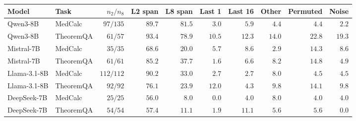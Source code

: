 \begin{tabular*}{\textwidth}{@{\extracolsep{\fill}}llrrrrrrrr@{}}
\toprule
Model & Task & $n_2/n_8$ & L2 span & L8 span & Last 1 & Last 16 & Other & Permuted & Noise \\
\midrule
Qwen3-8B & MedCalc & $97/135$ & $89.7$ & $81.5$ & $3.0$ & $5.9$ & $4.4$ & $4.4$ & $2.2$ \\
Qwen3-8B & TheoremQA & $61/57$ & $93.4$ & $78.9$ & $10.5$ & $12.3$ & $14.0$ & $22.8$ & $19.3$ \\
Mistral-7B & MedCalc & $35/35$ & $68.6$ & $20.0$ & $5.7$ & $8.6$ & $2.9$ & $14.3$ & $8.6$ \\
Mistral-7B & TheoremQA & $61/61$ & $85.2$ & $37.7$ & $1.6$ & $6.6$ & $8.2$ & $14.8$ & $4.9$ \\
Llama-3.1-8B & MedCalc & $112/112$ & $90.2$ & $33.0$ & $2.7$ & $2.7$ & $8.0$ & $4.5$ & $4.5$ \\
Llama-3.1-8B & TheoremQA & $92/92$ & $76.1$ & $23.9$ & $12.0$ & $4.3$ & $9.8$ & $14.1$ & $9.8$ \\
DeepSeek-7B & MedCalc & $25/25$ & $56.0$ & $8.0$ & $0.0$ & $4.0$ & $8.0$ & $4.0$ & $4.0$ \\
DeepSeek-7B & TheoremQA & $54/54$ & $57.4$ & $11.1$ & $1.9$ & $11.1$ & $5.6$ & $5.6$ & $0.0$ \\
\bottomrule
\end{tabular*}
